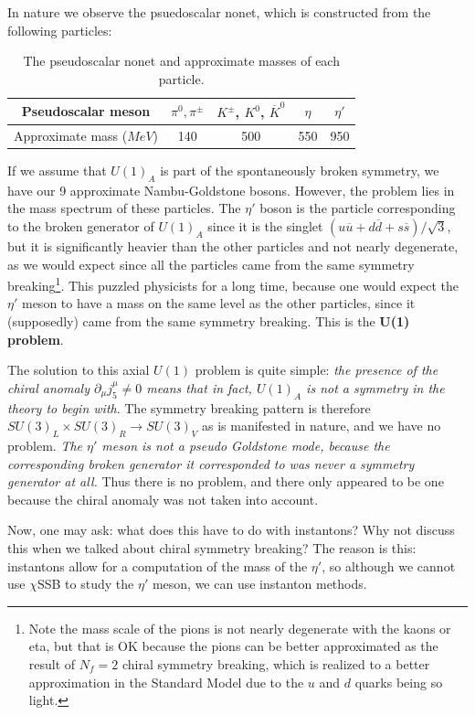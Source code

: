 \documentclass[11pt, oneside]{article}   	%
\theoremstyle{definition}
\begin{document}
In nature we observe the psuedoscalar nonet, which is constructed from the following particles:
\begin{table}[H]
	\centering
	\begin{tabular}{ | c | c | c | c | c | }
		\hline
		Pseudoscalar meson & $\pi^0, \pi^\pm$ & $K^\pm$, $K^0$, $\overline K^0$ & $\eta$ & $\eta'$ \\
		\hline
		Approximate mass ($MeV$) & 140 & 500 & 550 & 950 \\
		\hline
	\end{tabular}
	\caption{The pseudoscalar nonet and approximate masses of each particle.}
	\label{table:pseudoscalar_nonet}
\end{table}
If we assume that $U(1)_A$ is part of the spontaneously broken symmetry, we have our 9 approximate Nambu-Goldstone bosons. However, 
the problem lies in the mass spectrum of these particles. The $\eta'$ boson is the particle corresponding to the broken generator of 
$U(1)_A$ since it is the singlet $(u\overline u + d\overline d + s\overline s) / \sqrt 3$, but it is significantly heavier than the other particles 
and not nearly degenerate, as we would expect since all the particles came from the same symmetry breaking\footnote{Note the mass 
scale of the pions is not nearly degenerate with the kaons or eta, but that is OK because the pions can be better approximated as the 
result of $N_f = 2$ chiral symmetry breaking, which is realized to a better approximation in the Standard Model due to the $u$ and $d$ 
quarks being so light.}. This puzzled physicists for a long time, because one would expect the $\eta'$ meson to have a mass on the same 
level as the other particles, since it (supposedly) came from the same symmetry breaking. This is the \textbf{U(1) problem}. 

The solution to this axial $U(1)$ problem is quite simple: \textit{the presence of the chiral anomaly $\partial_\mu j_5^\mu\neq 0$ means that 
in fact, $U(1)_A$ is not a symmetry in the theory to begin with}. The symmetry breaking pattern is therefore $SU(3)_L\times SU(3)_R
\rightarrow SU(3)_V$ as is manifested in nature, and we have no problem. \textit{The $\eta'$ meson is not a pseudo Goldstone mode, 
because the corresponding broken generator it corresponded to was never a symmetry generator at all.} Thus there is no problem, and there 
only appeared to be one because the chiral anomaly was not taken into account. 

Now, one may ask: what does this have to do with instantons? Why not discuss this when we talked about chiral symmetry breaking? 
The reason is this: instantons allow for a computation of the mass of the $\eta'$, so although we cannot use $\chi$SSB to study the 
$\eta'$ meson, we can use instanton methods. 
\end{document}
